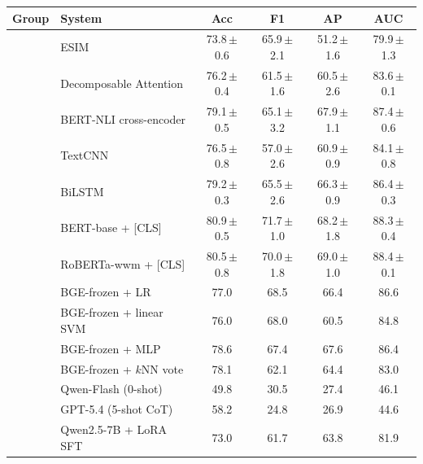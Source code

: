 \documentclass[11pt]{article}
\begin{document}
\begin{table}[t]
\centering\small
\setlength{\tabcolsep}{9pt}
\newcommand{\pmsd}[1]{\,{\scriptsize$\pm$#1}}
\begin{tabular}{llcccc}
\toprule
\textbf{Group} & \textbf{System} & \textbf{Acc} & \textbf{F1} & \textbf{AP} & \textbf{AUC} \\
\midrule
{}
 & ESIM                          & 73.8\pmsd{0.6} & 65.9\pmsd{2.1} & 51.2\pmsd{1.6} & 79.9\pmsd{1.3} \\
 & Decomposable Attention        & 76.2\pmsd{0.4} & 61.5\pmsd{1.6} & 60.5\pmsd{2.6} & 83.6\pmsd{0.1} \\
 & BERT-NLI cross-encoder        & 79.1\pmsd{0.5} & 65.1\pmsd{3.2} & 67.9\pmsd{1.1} & 87.4\pmsd{0.6} \\
\midrule
{}
 & TextCNN                       & 76.5\pmsd{0.8} & 57.0\pmsd{2.6} & 60.9\pmsd{0.9} & 84.1\pmsd{0.8} \\
 & BiLSTM                        & 79.2\pmsd{0.3} & 65.5\pmsd{2.6} & 66.3\pmsd{0.9} & 86.4\pmsd{0.3} \\
 & BERT-base + [CLS]             & 80.9\pmsd{0.5} & 71.7\pmsd{1.0} & 68.2\pmsd{1.8} & 88.3\pmsd{0.4} \\
 & RoBERTa-wwm + [CLS]           & 80.5\pmsd{0.8} & 70.0\pmsd{1.8} & 69.0\pmsd{1.0} & 88.4\pmsd{0.1} \\
\midrule
{}
 & BGE-frozen + LR               & 77.0 & 68.5 & 66.4 & 86.6 \\
 & BGE-frozen + linear SVM       & 76.0 & 68.0 & 60.5 & 84.8 \\
 & BGE-frozen + MLP              & 78.6 & 67.4 & 67.6 & 86.4 \\
 & BGE-frozen + $k$NN vote       & 78.1 & 62.1 & 64.4 & 83.0 \\
\midrule
{}
 & Qwen-Flash (0-shot)     & 49.8 & 30.5 & 27.4 & 46.1 \\
 & GPT-5.4 (5-shot CoT)    & 58.2 & 24.8 & 26.9 & 44.6 \\
 & Qwen2.5-7B + LoRA SFT   & 73.0 & 61.7 & 63.8 & 81.9 \\

\end{tabular}
\end{table}
\end{document}
